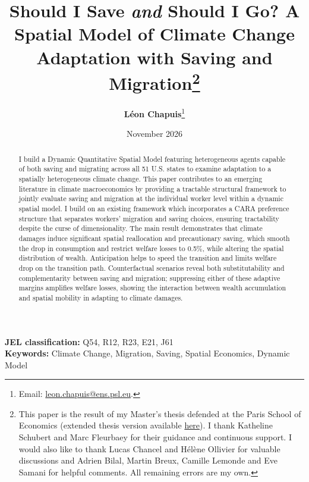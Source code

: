 \documentclass[11pt, a4paper]{article}
\begin{document}
\title{\Large \textbf{Should I Save \textit{and} Should I Go? A Spatial Model of Climate Change Adaptation with Saving and Migration}\thanks{This paper is the result of my Master's thesis defended at the Paris School of Economics (extended thesis version available \href{https://lchapuisb.github.io/SavingSIAM/master_thesis.pdf}{here}). I thank Katheline Schubert and Marc Fleurbaey for their guidance and continuous support. I would also like to thank Lucas Chancel and Hélène Ollivier for valuable discussions and Adrien Bilal, Martin Breux, Camille Lemonde and Eve Samani for helpful comments. All remaining errors are my own.}}
\author{
    \textbf{Léon Chapuis}\thanks{Email: \href{mailto:leon.chapuis@ens.psl.eu}{leon.chapuis@ens.psl.eu}.}
}
\date{November 2026}
\maketitle
\thispagestyle{plain}
\begin{abstract}
\noindent
I build a Dynamic Quantitative Spatial Model featuring heterogeneous agents capable of both saving and migrating across all 51 U.S. states to examine adaptation to a spatially heterogeneous climate change. This paper contributes to an emerging literature in climate macroeconomics by providing a tractable structural framework to jointly evaluate saving and migration at the individual worker level within a dynamic spatial model. I build on an existing framework which incorporates a CARA preference structure that separates workers' migration and saving choices, ensuring tractability despite the curse of dimensionality. The main result demonstrates that climate damages induce significant spatial reallocation and precautionary saving, which smooth the drop in consumption and restrict welfare losses to 0.5\%, while altering the spatial distribution of wealth. Anticipation helps to speed the transition and limits welfare drop on the transition path. Counterfactual scenarios reveal both substitutability and complementarity between saving and migration; suppressing either of these adaptive margins amplifies welfare losses, showing the interaction between wealth accumulation and spatial mobility in adapting to climate damages.
\end{abstract}
\vspace{0.8em}
\noindent \textbf{JEL classification:} Q54, R12, R23, E21, J61 \\
\textbf{Keywords:} Climate Change, Migration, Saving, Spatial Economics, Dynamic Model
\vspace{1em}
\end{document}
